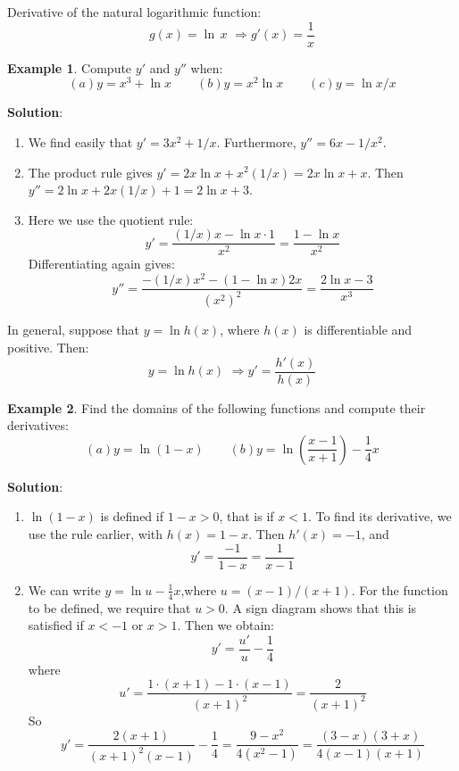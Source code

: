 \documentclass[10pt,a4paper]{book}
\theoremstyle{definition}\newtheorem{definition}{Definition}
\theoremstyle{definition}\newtheorem{fact}{Fact}
\theoremstyle{definition}\newtheorem{ex}{Ex.}
\theoremstyle{definition}\newtheorem{project}{Project}
\theoremstyle{definition}\newtheorem{problem}{Problem}
\theoremstyle{definition}\newtheorem{example}{Example}
\numberwithin{theorem}{chapter}
\numberwithin{corollary}{chapter}
\numberwithin{assumption}{chapter}
\numberwithin{definition}{chapter}
\numberwithin{prop}{chapter}
\numberwithin{notation}{chapter}
\numberwithin{problem}{chapter}
\numberwithin{example}{chapter}
\numberwithin{fact}{chapter}
\numberwithin{ex}{chapter}
\begin{document}
	Derivative of the natural logarithmic function:
	$$ g(x) = \ln\,x \,\, \Rightarrow g'(x) = \frac{1}{x}$$
	
	\begin{example}
		Compute $y'$ and $y''$ when:
		\begin{equation*}
			(a) y=x^3+\ln x \qquad
			(b) y=x^2 \ln x \qquad
			(c) y=\ln x/x
		\end{equation*}
		
		\textbf{Solution}:
		\begin{enumerate}[label=(\alph*)]
			\item We find easily that $y' = 3x^2 + 1/x$. Furthermore, $y'' = 6x - 1/x^2$.
			\item The product rule gives $y' = 2x \ln x + x^2(1/x) = 2x \ln x + x$. Then $y'' =2\ln x+2x(1/x)+1=2\ln x+3$.
			\item Here we use the quotient rule:
			$$y'=\frac{(1/x)x- \ln x \cdot 1}{x^2} = \frac{1-\ln x}{x^2}$$
			Differentiating again gives:
			$$y''=\frac{-(1/x)x^2-(1-\ln x)2x}{(x^2)^2}=\frac{2\ln x-3}{x^3}$$
		\end{enumerate}
	\end{example}
	
	In general, suppose that $y = \ln h(x)$, where $h(x)$ is differentiable and positive. Then:
	$$y=\ln h(x) \,\, \Rightarrow y'=\frac{h'(x)}{h(x)}$$
	
	\begin{example}
		Find the domains of the following functions and compute their derivatives:
		\begin{equation*}
			(a) y=\ln(1-x) \qquad
			(b) y=\ln\left(\frac{x-1}{x+1} \right)-\frac{1}{4}x
		\end{equation*}
		
		\textbf{Solution}:
		\begin{enumerate}[label=(\alph*)]
			\item $\ln(1-x)$ is defined if $1-x>0$, that is if $x<1$. To find its derivative, we use the rule earlier, with $h(x) = 1 - x$. Then $h'(x) = -1$, and
			$$y'=\frac{-1}{1-x}=\frac{1}{x-1}$$
			\item We can write $y=\ln u - \frac{1}{4}x$,where $u=(x-1)/(x+1)$. For the function to be defined, we require that $u > 0$. A sign diagram shows that this is satisfied if $x < -1$ or $x > 1$. Then we obtain:
			$$y'=\frac{u'}{u}-\frac{1}{4}$$
			where
			$$u'=\frac{1\cdot (x+1)- 1\cdot(x-1)}{(x+1)^2}=\frac{2}{(x+1)^2}$$
			So
			$$y'=\frac{2(x+1)}{(x+1)^2(x-1)}-\frac{1}{4}=\frac{9-x^2}{4(x^2-1)}=\frac{(3-x)(3+x)}{4(x-1)(x+1)}$$
		\end{enumerate}
	\end{example}
	
\end{document}
